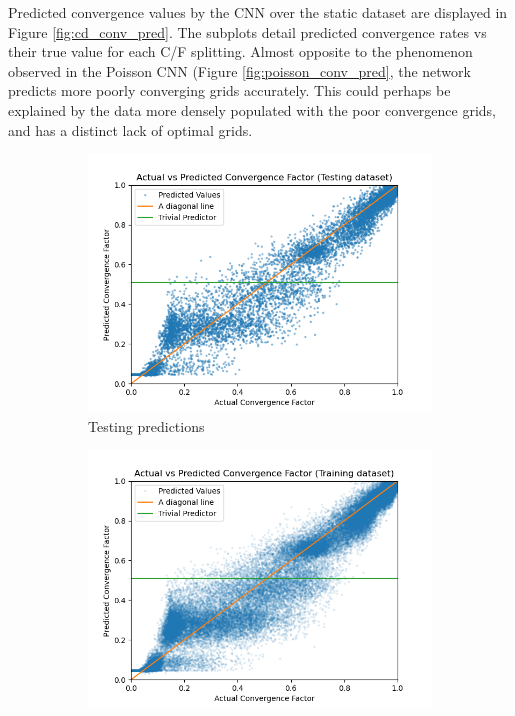\documentclass{siamart190516}
\begin{document}
Predicted convergence values by the CNN over the static dataset are displayed in Figure \ref{fig:cd_conv_pred}.  The subplots detail predicted convergence rates vs their true value for each C/F splitting.  Almost opposite to the phenomenon observed in the Poisson CNN (Figure \ref{fig:poisson_conv_pred}, the network predicts more poorly converging grids accurately.  This could perhaps be explained by the data more densely populated with the poor convergence grids, and has a distinct lack of optimal grids.

\begin{figure}[h]
  \centering
  \begin{subfigure}{.48\textwidth}
    \includegraphics[width=\textwidth]{figs/cd_conv_test_pred.png}
    \caption{Testing predictions}
    \label{subfig:cd_conv_test}
  \end{subfigure}
  \begin{subfigure}{.48\textwidth}
    \includegraphics[width=\textwidth]{figs/cd_conv_train_pred.png}

\end{subfigure}
\end{figure}
\end{document}
